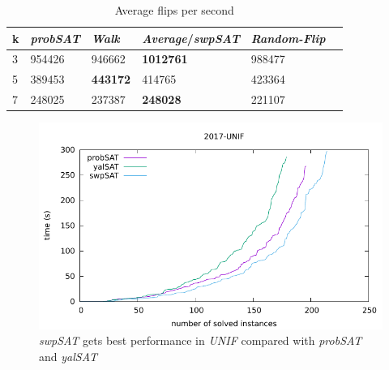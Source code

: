 \documentclass[12pt,a4paper,twoside]{scrartcl}
\numberwithin{equation}{section}
\begin{document}
   \begin{table}[H]
   \label{tab:flips}
\begin{center}
    \begin{tabular}{|l|l|l|l|l|p{3cm}|}
\hline 

    k &\emph{probSAT}&\emph{Walk}&\emph{Average}/\emph{swpSAT}&\emph{Random-Flip} \\ \hline      
    3& 954426 &946662 &\textbf{1012761}&988477 \\ \hline
    5& 389453&\textbf{443172}&414765&423364\\ \hline
    7& 248025 &237387 &\textbf{248028}&221107 \\ \hline
	
\end{tabular}
\end{center}
\caption{Average flips per second}
\end{table}
  \begin{figure}[H]
\begin{center}
  \includegraphics[scale = 1]{DATA/UNIF/e5.pdf}
  \end{center}
  \caption{\emph{swpSAT} gets best performance in \emph{UNIF} compared with \emph{probSAT} and \emph{yalSAT} }
  \label{Experiment 9 all cactus plot}
  \end{figure} 
\clearpage
\clearpage
\end{document}
